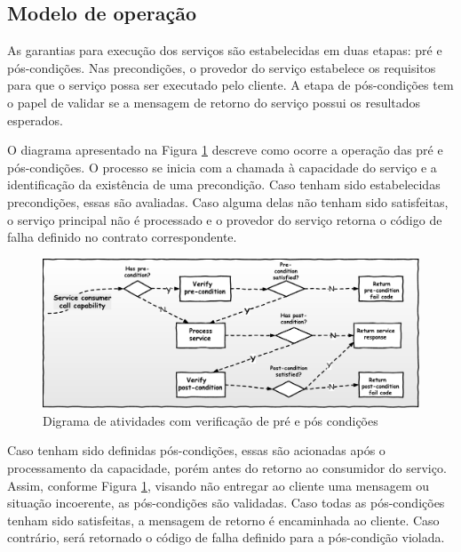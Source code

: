 \vspace{-6mm}

\subsection{Modelo de operação}
\vspace{-6mm}

As garantias para execução dos serviços são estabelecidas em duas etapas: pré e
pós-condições. Nas precondições, o provedor do serviço estabelece os requisitos
para que o serviço possa ser executado pelo cliente. A etapa de pós-condições
tem o papel de validar se a mensagem de retorno do serviço possui os resultados
esperados.

O diagrama apresentado na Figura \ref{FigServiceDbC} descreve como ocorre a
operação das pré e pós-condições. O processo se inicia com a chamada à capacidade do serviço e a
identificação da existência de uma precondição. Caso tenham sido estabelecidas 
precondições, essas são avaliadas. Caso alguma delas não tenham sido
satisfeitas, o serviço principal não é processado e o provedor do serviço
retorna o código de falha definido no contrato correspondente.


\begin{figure}[!htb]
\centering
\includegraphics[width=140mm,trim = 0mm 0mm 0mm
0mm,clip]{img/FluxoDbcCondicoes.pdf} 
\caption{Digrama de atividades com verificação de pré e pós condições}
\label{FigServiceDbC}
\end{figure}

Caso tenham sido definidas pós-condições, essas são acionadas após o
processamento da capacidade, porém antes do retorno ao consumidor do serviço.
Assim, conforme Figura \ref{FigServiceDbC}, visando não entregar ao cliente uma
mensagem ou situação incoerente, as pós-condições são validadas. Caso todas as
pós-condições tenham sido satisfeitas, a mensagem de retorno é encaminhada ao
cliente. Caso contrário, será retornado o código de falha definido para a
pós-condição violada.

